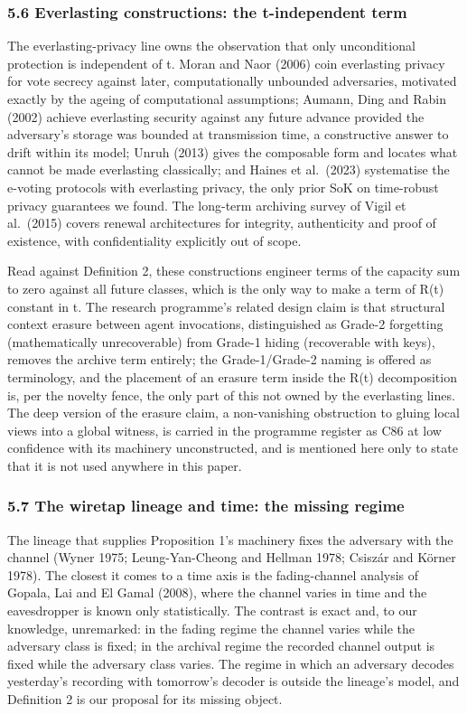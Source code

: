 \documentclass[
]{llncs}
\begin{document}
\subsubsection{5.6 Everlasting constructions: the t-independent
term}\label{everlasting-constructions-the-t-independent-term}

The everlasting-privacy line owns the observation that only
unconditional protection is independent of t. Moran and Naor (2006) coin
everlasting privacy for vote secrecy against later, computationally
unbounded adversaries, motivated exactly by the ageing of computational
assumptions; Aumann, Ding and Rabin (2002) achieve everlasting security
against any future advance provided the adversary's storage was bounded
at transmission time, a constructive answer to drift within its model;
Unruh (2013) gives the composable form and locates what cannot be made
everlasting classically; and Haines et al.~(2023) systematise the
e-voting protocols with everlasting privacy, the only prior SoK on
time-robust privacy guarantees we found. The long-term archiving survey
of Vigil et al.~(2015) covers renewal architectures for integrity,
authenticity and proof of existence, with confidentiality explicitly out
of scope.

Read against Definition 2, these constructions engineer terms of the
capacity sum to zero against all future classes, which is the only way
to make a term of R(t) constant in t. The research programme's related
design claim is that structural context erasure between agent
invocations, distinguished as Grade-2 forgetting (mathematically
unrecoverable) from Grade-1 hiding (recoverable with keys), removes the
archive term entirely; the Grade-1/Grade-2 naming is offered as
terminology, and the placement of an erasure term inside the R(t)
decomposition is, per the novelty fence, the only part of this not owned
by the everlasting lines. The deep version of the erasure claim, a
non-vanishing obstruction to gluing local views into a global witness,
is carried in the programme register as C86 at low confidence with its
machinery unconstructed, and is mentioned here only to state that it is
not used anywhere in this paper.

\subsubsection{5.7 The wiretap lineage and time: the missing
regime}\label{the-wiretap-lineage-and-time-the-missing-regime}

The lineage that supplies Proposition 1's machinery fixes the adversary
with the channel (Wyner 1975; Leung-Yan-Cheong and Hellman 1978; Csiszár
and Körner 1978). The closest it comes to a time axis is the
fading-channel analysis of Gopala, Lai and El Gamal (2008), where the
channel varies in time and the eavesdropper is known only statistically.
The contrast is exact and, to our knowledge, unremarked: in the fading
regime the channel varies while the adversary class is fixed; in the
archival regime the recorded channel output is fixed while the adversary
class varies. The regime in which an adversary decodes yesterday's
recording with tomorrow's decoder is outside the lineage's model, and
Definition 2 is our proposal for its missing object.
\end{document}
